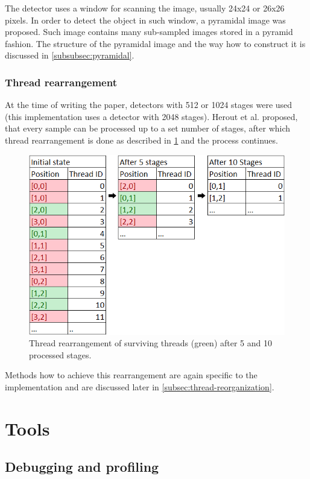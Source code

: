 The detector uses a window for scanning the image, usually 24x24 or 26x26 pixels. In order to detect the object in such window, a pyramidal image was proposed. Such image contains many sub-sampled images stored in a pyramid fashion. The structure of the pyramidal image and the way how to construct it is discussed in \ref{subsubsec:pyramidal}.

\subsubsection{Thread rearrangement}

At the time of writing the paper, detectors with 512 or 1024 stages were used (this implementation uses a detector with 2048 stages). Herout et al. proposed, that every sample can be processed up to a set number of stages, after which thread rearrangement is done as described in \ref{fig:thread-rearrangement} and the process continues.

\begin{center}
\begin{figure}[h]
	\centering\includegraphics[width=0.6\linewidth]{fig/threadrear.png}
	\caption{Thread rearrangement of surviving threads (green) after 5 and 10 processed stages.}
	\label{fig:thread-rearrangement}
\end{figure}
\end{center}

Methods how to achieve this rearrangement are again specific to the implementation and are discussed later in \ref{subsec:thread-reorganization}.

\section{Tools}

\subsection{Debugging and profiling}\label{subsec:debugging-and-profiling}

